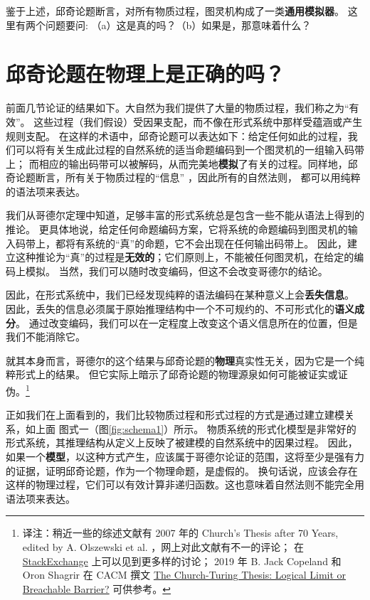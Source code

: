 \documentclass[a4paper,12pt]{article}
\begin{document}
鉴于上述，邱奇论题断言，对所有物质过程，图灵机构成了一类\textbf{通用模拟器}。 这里有两个问题要问: （a）这是真的吗？（b）如果是，那意味着什么？

\section{邱奇论题在物理上是正确的吗？}

前面几节论证的结果如下。大自然为我们提供了大量的物质过程，我们称之为“有效”。
这些过程（我们假设）受因果支配，而不像在形式系统中那样受蕴涵或产生规则支配。
在这样的术语中，邱奇论题可以表达如下：给定任何如此的过程，我们可以将有关生成此过程的自然系统的适当命题编码到一个图灵机的一组输入码带上；
而相应的输出码带可以被解码，从而完美地\textbf{模拟}了有关的过程。同样地，邱奇论题断言，所有关于物质过程的“信息” ，因此所有的自然法则，
都可以用纯粹的语法项来表达。

我们从哥德尔定理中知道，足够丰富的形式系统总是包含一些不能从语法上得到的推论。
更具体地说，给定任何命题编码方案，它将系统的命题编码到图灵机的输入码带上，都将有系统的“真”的命题，它不会出现在任何输出码带上。
因此，建立这种推论为“真”的过程是\textbf{无效的}；它们原则上，不能被任何图灵机，在给定的编码上模拟。
当然，我们可以随时改变编码，但这不会改变哥德尔的结论。

因此，在形式系统中，我们已经发现纯粹的语法编码在某种意义上会\textbf{丢失信息}。
因此，丢失的信息必须属于原始推理结构中一个不可规约的、不可形式化的\textbf{语义成分}。
通过改变编码，我们可以在一定程度上改变这个语义信息所在的位置，但是我们不能消除它。

就其本身而言，哥德尔的这个结果与邱奇论题的\textbf{物理}真实性无关，因为它是一个纯粹形式上的结果。
但它实际上暗示了邱奇论题的物理源泉如何可能被证实或证伪。\footnote[1]{
译注：稍近一些的综述文献有 2007 年的 Church's Thesis after 70 Years, edited by A. Olszewski et al. ，网上对此文献有不一的评论；
在 \href{https://cstheory.stackexchange.com/questions/88/what-would-it-mean-to-disprove-church-turing-thesis}{StackExchange} 上可以见到更多样的讨论；
2019 年 B. Jack Copeland 和 Oron Shagrir 在 CACM 撰文 \href{https://cacm.acm.org/magazines/2019/1/233526-the-church-turing-thesis/fulltext}{The Church-Turing Thesis: Logical Limit or Breachable Barrier?} 可供参考。}

正如我们在上面看到的，我们比较物质过程和形式过程的方式是通过建立建模关系，如上面 图式一（图\ref{fig:schema1}）所示。
物质系统的形式化模型是非常好的形式系统，其推理结构从定义上反映了被建模的自然系统中的因果过程。
因此，如果一个\textbf{模型}，以这种方式产生，应该属于哥德尔论证的范围，这将至少是强有力的证据，证明邱奇论题，作为一个物理命题，是虚假的。
换句话说，应该会存在这样的物理过程，它们可以有效计算非递归函数。这也意味着自然法则不能完全用语法项来表达。
\end{document}
